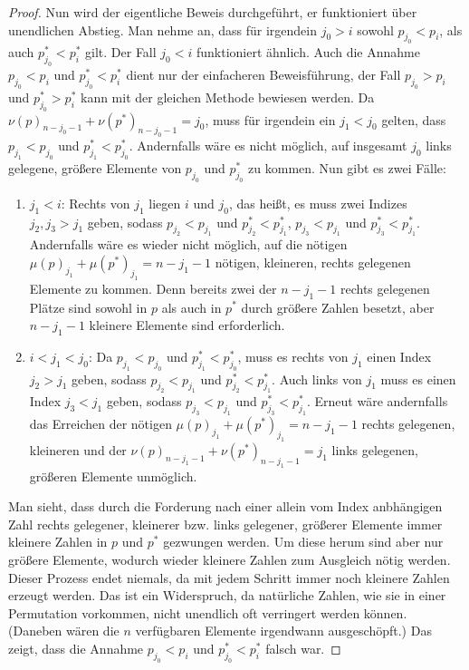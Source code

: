 \documentclass[a4paper, 10pt, ngerman]{article}
\begin{document}
\begin{proof}
    Nun wird der eigentliche Beweis durchgeführt, er funktioniert über unendlichen Abstieg. Man nehme an, dass für irgendein $j_0 > i$ sowohl $p_{j_0} < p_i$, als auch $p^*_{j_0} < p^*_i$ gilt. Der Fall $j_0 < i$ funktioniert ähnlich. Auch die Annahme $p_{j_0} < p_i$ und $p^*_{j_0} < p^*_i$ dient nur der einfacheren Beweisführung, der Fall $p_{j_0} > p_i$ und $p^*_{j_0} > p^*_i$ kann mit der gleichen Methode bewiesen werden. Da $\nu(p)_{n - j_0 - 1} + \nu(p^*)_{n - j_0 - 1} = j_0$, muss für irgendein ein $j_1 < j_0$ gelten, dass $p_{j_1} < p_{j_0}$ und $p^*_{j_1} < p^*_{j_0}$. Andernfalls wäre es nicht möglich, auf insgesamt $j_0$ links gelegene, größere Elemente von $p_{j_0}$ und $p^*_{j_0}$ zu kommen. Nun gibt es zwei Fälle:
    \begin{enumerate}
        \item $j_1 < i$: Rechts von $j_1$ liegen $i$ und $j_0$, das heißt, es muss zwei Indizes $j_2, j_3 > j_1$ geben, sodass $p_{j_2} < p_{j_1}$ und $p^*_{j_2} < p^*_{j_1}$, $p_{j_3} < p_{j_1}$ und $p^*_{j_3} < p^*_{j_1}$. Andernfalls wäre es wieder nicht möglich, auf die nötigen $\mu(p)_{j_1} + \mu(p^*)_{j_1} = n - j_1 - 1$ nötigen, kleineren, rechts gelegenen Elemente zu kommen. Denn bereits zwei der $n - j_1 - 1$ rechts gelegenen Plätze sind sowohl in $p$ als auch in $p^*$ durch größere Zahlen besetzt, aber $n - j_1 - 1$ kleinere Elemente sind erforderlich.
        \item $i < j_1 < j_0$: Da $p_{j_1} < p_{j_0}$ und $p^*_{j_1} < p^*_{j_0}$, muss es rechts von $j_1$ einen Index $j_2 > j_1$ geben, sodass $p_{j_2} < p_{j_1}$ und $p^*_{j_2} < p^*_{j_1}$. Auch links von $j_1$ muss es einen Index $j_3 < j_1$ geben, sodass $p_{j_3} < p_{j_1}$ und $p^*_{j_3} < p^*_{j_1}$. Erneut wäre andernfalls das Erreichen der nötigen $\mu(p)_{j_1} + \mu(p^*)_{j_1} = n - j_1 - 1$ rechts gelegenen, kleineren und der $\nu(p)_{n - j_1 - 1} + \nu(p^*)_{n - j_1 - 1} = j_1$ links gelegenen, größeren Elemente unmöglich.
    \end{enumerate}
    Man sieht, dass durch die Forderung nach einer allein vom Index anbhängigen Zahl rechts gelegener, kleinerer bzw. links gelegener, größerer Elemente immer kleinere Zahlen in $p$ und $p^*$ gezwungen werden. Um diese herum sind aber nur größere Elemente, wodurch wieder kleinere Zahlen zum Ausgleich nötig werden. Dieser Prozess endet niemals, da mit jedem Schritt immer noch kleinere Zahlen erzeugt werden. Das ist ein Widerspruch, da natürliche Zahlen, wie sie in einer Permutation vorkommen, nicht unendlich oft verringert werden können. (Daneben wären die $n$ verfügbaren Elemente irgendwann ausgeschöpft.) Das zeigt, dass die Annahme $p_{j_0} < p_i$ und $p^*_{j_0} < p^*_i$ falsch war.
\end{proof}
\end{document}
